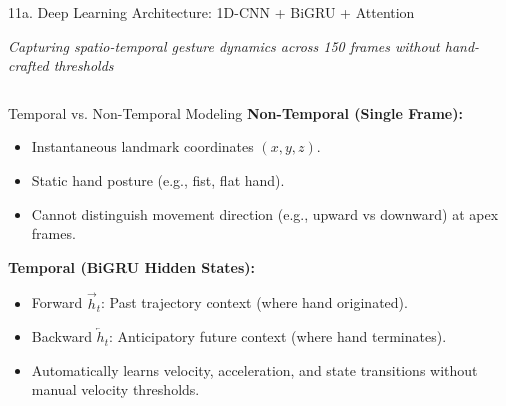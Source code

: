 \documentclass[aspectratio=169]{beamer}
\begin{document}
\begin{frame}[t]{11a. Deep Learning Architecture: 1D-CNN + BiGRU + Attention}
\vspace{-0.1cm}
\begin{center}
    \scriptsize\textit{\textcolor{amritaMaroon}{Capturing spatio-temporal gesture dynamics across 150 frames without hand-crafted thresholds}}
\end{center}

\vspace{-1.5mm}
\begin{columns}[T]
    \begin{block}{Temporal vs. Non-Temporal Modeling}
        \fontsize{6.8pt}{8.6pt}\selectfont
        \textbf{Non-Temporal (Single Frame):}
        \begin{itemize}\setlength{\itemsep}{1pt}
            \item Instantaneous landmark coordinates $(x, y, z)$.
            \item Static hand posture (e.g., fist, flat hand).
            \item Cannot distinguish movement direction (e.g., upward vs downward) at apex frames.
        \end{itemize}
        \vspace{1mm}
        \textbf{Temporal (BiGRU Hidden States):}
        \begin{itemize}\setlength{\itemsep}{1pt}
            \item Forward $\overrightarrow{h}_t$: Past trajectory context (where hand originated).
            \item Backward $\overleftarrow{h}_t$: Anticipatory future context (where hand terminates).
            \item Automatically learns velocity, acceleration, and state transitions without manual velocity thresholds.
        \end{itemize}
    \end{block}


\end{columns}
\end{frame}
\end{document}
